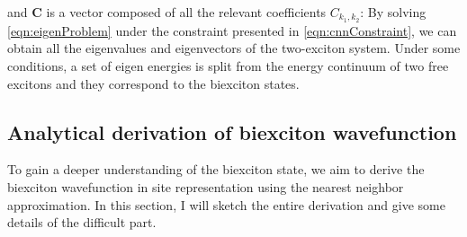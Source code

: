 and  $\mathbf{C}$ is a vector composed of all the relevant coefficients $C_{k_1, k_2}$:
By solving \autoref{eqn:eigenProblem} under the constraint presented in \autoref{eqn:cnnConstraint}, we can obtain
 all the eigenvalues and eigenvectors of the 
two-exciton system. Under some conditions, a set of eigen energies is split from the energy continuum of two free
 excitons and they correspond to the biexciton states. 



\subsection{Analytical derivation of biexciton wavefunction}
\label{sec:biexcitonWavefunction}
To gain a deeper understanding of the biexciton state, we aim to derive the biexciton wavefunction in site
 representation using the nearest neighbor approximation. In this section, I will sketch the entire derivation and give
 some details of the difficult part. 


